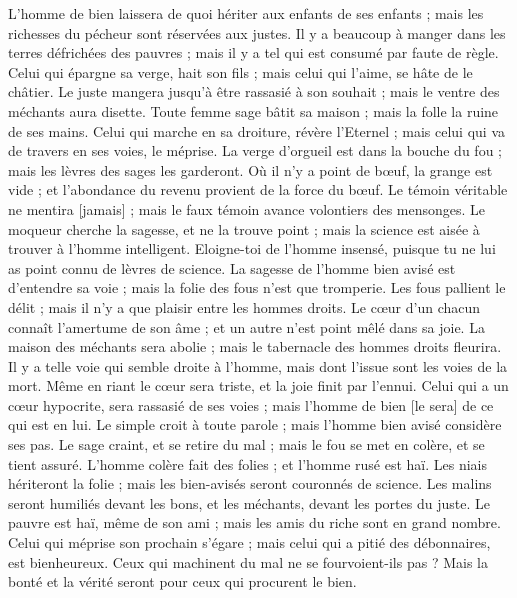 \begin{multicols}{2}
L'homme de bien laissera de quoi hériter aux enfants de ses enfants ; mais les richesses du pécheur sont réservées aux justes.
Il y a beaucoup à manger dans les terres défrichées des pauvres ; mais il y a tel qui est consumé par faute de règle.
Celui qui épargne sa verge, hait son fils ; mais celui qui l'aime, se hâte de le châtier.
Le juste mangera jusqu'à être rassasié à son souhait ; mais le ventre des méchants aura disette.
\VerseOne{}Toute femme sage bâtit sa maison ; mais la folle la ruine de ses mains.
Celui qui marche en sa droiture, révère l'Eternel ; mais celui qui va de travers en ses voies, le méprise.
La verge d'orgueil est dans la bouche du fou ; mais les lèvres des sages les garderont.
Où il n'y a point de bœuf, la grange est vide ; et l'abondance du revenu provient de la force du bœuf.
Le témoin véritable ne mentira [jamais] ; mais le faux témoin avance volontiers des mensonges.
Le moqueur cherche la sagesse, et ne la trouve point ; mais la science est aisée à trouver à l'homme intelligent.
Eloigne-toi de l'homme insensé, puisque tu ne lui as point connu de lèvres de science.
La sagesse de l'homme bien avisé est d'entendre sa voie ; mais la folie des fous n'est que tromperie.
Les fous pallient le délit ; mais il n'y a que plaisir entre les hommes droits.
Le cœur d'un chacun connaît l'amertume de son âme ; et un autre n'est point mêlé dans sa joie.
La maison des méchants sera abolie ; mais le tabernacle des hommes droits fleurira.
Il y a telle voie qui semble droite à l'homme, mais dont l'issue sont les voies de la mort.
Même en riant le cœur sera triste, et la joie finit par l'ennui.
Celui qui a un cœur hypocrite, sera rassasié de ses voies ; mais l'homme de bien [le sera] de ce qui est en lui.
Le simple croit à toute parole ; mais l'homme bien avisé considère ses pas.
Le sage craint, et se retire du mal ; mais le fou se met en colère, et se tient assuré.
L'homme colère fait des folies ; et l'homme rusé est haï.
Les niais hériteront la folie ; mais les bien-avisés seront couronnés de science.
Les malins seront humiliés devant les bons, et les méchants, devant les portes du juste.
Le pauvre est haï, même de son ami ; mais les amis du riche sont en grand nombre.
Celui qui méprise son prochain s'égare ; mais celui qui a pitié des débonnaires, est bienheureux.
Ceux qui machinent du mal ne se fourvoient-ils pas ? Mais la bonté et la vérité seront pour ceux qui procurent le bien.

\end{multicols}
